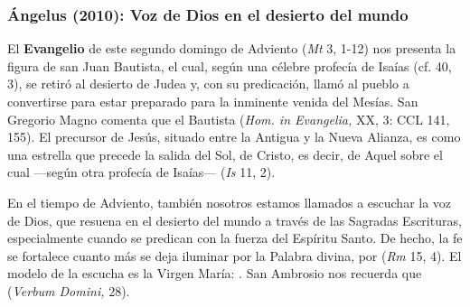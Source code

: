 			\subsubsection{Ángelus (2010): Voz de Dios en el desierto del mundo}
			
			
			\begin{body}
				El \textbf{Evangelio} de este segundo domingo de Adviento (\emph{Mt} 3, 1-12) nos presenta la figura de san Juan Bautista, el cual, según una célebre profecía de Isaías (cf. 40, 3), se retiró al desierto de Judea y, con su predicación, llamó al pueblo a convertirse para estar preparado para la inminente venida del Mesías. San Gregorio Magno comenta que el Bautista  (\emph{Hom. in Evangelia,} XX, 3: CCL 141, 155). El precursor de Jesús, situado entre la Antigua y la Nueva Alianza, es como una estrella que precede la salida del Sol, de Cristo, es decir, de Aquel sobre el cual ---según otra profecía de Isaías---  (\emph{Is} 11, 2).
				
				En el tiempo de Adviento, también nosotros estamos llamados a escuchar la voz de Dios, que resuena en el desierto del mundo a través de las Sagradas Escrituras, especialmente cuando se predican con la fuerza del Espíritu Santo. De hecho, la fe se fortalece cuanto más se deja iluminar por la Palabra divina, por  (\emph{Rm} 15, 4). El modelo de la escucha es la Virgen María: . San Ambrosio nos recuerda que  (\emph{Verbum Domini,} 28).
				

\end{body}
